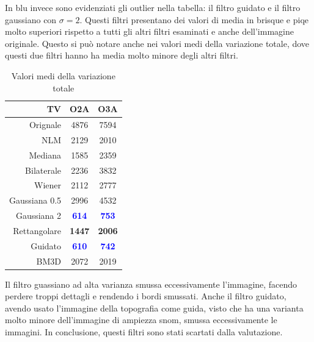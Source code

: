 \documentclass[../main.tex]{subfiles}
\begin{document}
In blu invece sono evidenziati gli outlier nella tabella: il filtro guidato e il filtro gaussiano con $\sigma = 2$. Questi filtri presentano dei valori di media in \acrshort{brisque} e \acrshort{piqe} molto superiori rispetto a tutti gli altri filtri esaminati e anche dell'immagine originale. Questo si può notare anche nei valori medi della variazione totale, dove questi due filtri hanno ha media molto minore degli altri filtri.

\begin{table}[h]
	\centering
	\begin{tabular}{r||c|c}
		TV\hspace{10pt}	& O2A  & O3A \\\hline\hline
		Orignale   		& 4876 & 7594\\
		NLM         	& 2129 & 2010\\
		Mediana     	& 1585 & 2359\\
		Bilaterale    	& 2236 & 3832\\
		Wiener        	& 2112 & 2777\\
		Gaussiana 0.5 	& 2996 & 4532\\
		Gaussiana 2   	& \textcolor{blue}{\textbf{614}}  & \textcolor{blue}{\textbf{753}}\\
		Rettangolare 	& \textbf{1447} & \textbf{2006}\\
		Guidato        	& \textcolor{blue}{\textbf{610}}  & \textcolor{blue}{\textbf{742}}\\
		BM3D   			& 2072 & 2019
	\end{tabular}
	\caption{Valori medi della variazione totale}
\end{table}

Il filtro guassiano ad alta varianza smussa eccessivamente l'immagine, facendo perdere troppi dettagli e rendendo i bordi smussati. Anche il filtro guidato, avendo usato l'immagine della topografia come guida, visto che ha una varianta molto minore dell'immagine di ampiezza \acrshort{snom}, smussa eccessivamente le immagini. In conclusione, questi filtri sono stati scartati dalla valutazione.\\
\end{document}
